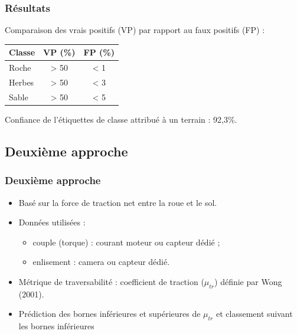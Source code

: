     \begin{frame}
        \frametitle{Résultats}
        Comparaison des vrais positifs (VP) par rapport au faux positifs (FP) :\\
        \begin{center}              
            \begin{tabular}{|lcc|}
                \hline
                Classe & VP (\%) &  FP (\%)\\
                \hline
                Roche & > 50 & < 1 \\
                Herbes & > 50 & < 3 \\
                Sable & > 50 & < 5\\
                \hline           
            \end{tabular}        
        \end{center} 
        Confiance de l'étiquettes de classe attribué à un terrain : 92,3\%.
    \end{frame}
    
\subsection{Deuxième approche}
    \begin{frame}[allowframebreaks]
        \frametitle{Deuxième approche}
        \begin{itemize}
            \item Basé sur la force de traction net entre la roue et le sol.
            \item Données utilisées :
            \begin{itemize}
                \item couple (torque) : courant moteur ou capteur dédié ;
                \item enlisement : camera ou capteur dédié.
            \end{itemize}
            \item Métrique de traversabilité : coefficient de traction ($\mu_{tr}$) définie par Wong (2001).            
            \item Prédiction des bornes inférieures et supérieures de $\mu_{tr}$ et classement suivant les bornes inférieures
        \end{itemize}
        
    \end{frame}
    
